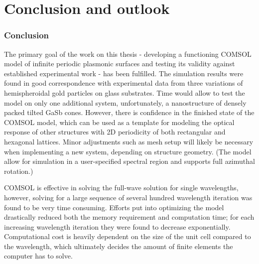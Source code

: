 
\chapter{Conclusion and outlook}

\subsection*{Conclusion}
The primary goal of the work on this thesis - developing a functioning COMSOL model of infinite periodic plasmonic surfaces and testing its validity against established experimental work - has been fulfilled. The simulation results were found in good correspondence with experimental data from three variations of hemispheroidal gold particles on glass substrates. Time would allow to test the model on only one additional system, unfortunately, a nanostructure of densely packed tilted GaSb cones. However, there is confidence in the finished state of the COMSOL model, which can be used as a template for modeling the optical response of other structures with 2D periodicity of both rectangular and hexagonal lattices. Minor adjustments such as mesh setup will likely be necessary when implementing a new system, depending on structure geometry. (The model allow for simulation in a user-specified spectral region and supports full azimuthal rotation.)


COMSOL is effective in solving the full-wave solution for single wavelengths, however, solving for a large sequence of several hundred wavelength iteration was found to be very time consuming. Efforts put into optimizing the model drastically reduced both the memory requirement and computation time; for each increasing wavelength iteration they were found to decrease exponentially. Computational cost is heavily dependent on the size of the unit cell compared to the wavelength, which ultimately decides the amount of finite elements the computer has to solve. %

